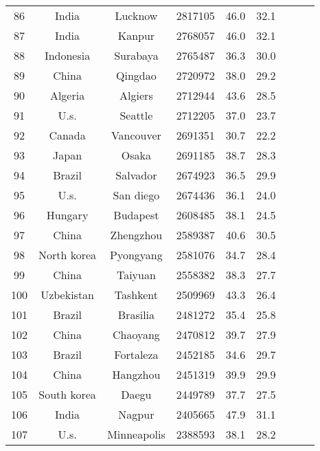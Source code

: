 \begin{table}
\begin{tabular}{ccccccccc}
  86 &               India &         Lucknow &    2817105 &     46.0 &     32.1 \\
  87 &               India &          Kanpur &    2768057 &     46.0 &     32.1 \\
  88 &           Indonesia &        Surabaya &    2765487 &     36.3 &     30.0 \\
  89 &               China &         Qingdao &    2720972 &     38.0 &     29.2 \\
  90 &             Algeria &         Algiers &    2712944 &     43.6 &     28.5 \\
  91 &                U.s. &         Seattle &    2712205 &     37.0 &     23.7 \\
  92 &              Canada &       Vancouver &    2691351 &     30.7 &     22.2 \\
  93 &               Japan &           Osaka &    2691185 &     38.7 &     28.3 \\
  94 &              Brazil &        Salvador &    2674923 &     36.5 &     29.9 \\
  95 &                U.s. &       San diego &    2674436 &     36.1 &     24.0 \\
  96 &             Hungary &        Budapest &    2608485 &     38.1 &     24.5 \\
  97 &               China &       Zhengzhou &    2589387 &     40.6 &     30.5 \\
  98 &         North korea &       Pyongyang &    2581076 &     34.7 &     28.4 \\
  99 &               China &         Taiyuan &    2558382 &     38.3 &     27.7 \\
 100 &          Uzbekistan &        Tashkent &    2509969 &     43.3 &     26.4 \\
 101 &              Brazil &        Brasilia &    2481272 &     35.4 &     25.8 \\
 102 &               China &        Chaoyang &    2470812 &     39.7 &     27.9 \\
 103 &              Brazil &       Fortaleza &    2452185 &     34.6 &     29.7 \\
 104 &               China &        Hangzhou &    2451319 &     39.9 &     29.9 \\
 105 &         South korea &           Daegu &    2449789 &     37.7 &     27.5 \\
 106 &               India &          Nagpur &    2405665 &     47.9 &     31.1 \\
 107 &                U.s. &     Minneapolis &    2388593 &     38.1 &     28.2 \\

\end{tabular}
\end{table}
